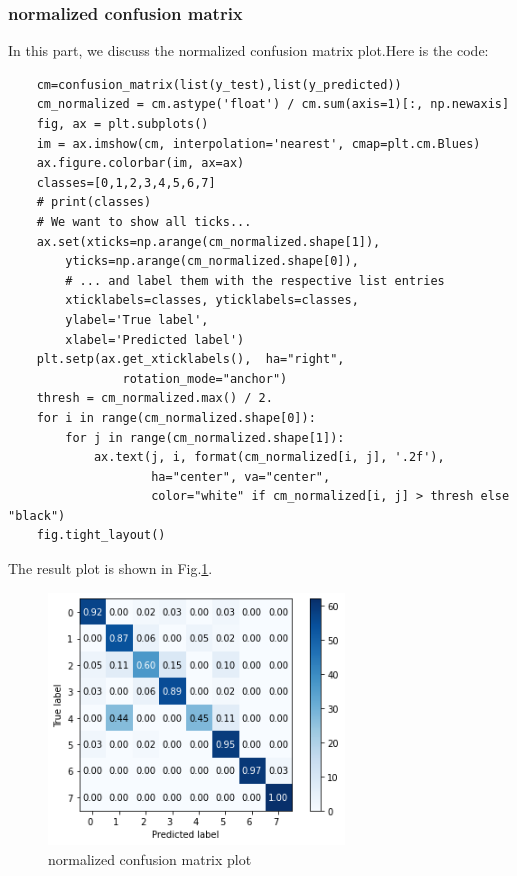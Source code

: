 \documentclass[conference]{IEEEtran}
\begin{document}
\subsubsection{normalized confusion matrix}
In this part, we discuss the normalized confusion matrix plot.Here is the code:
\begin{lstlisting}
    cm=confusion_matrix(list(y_test),list(y_predicted))
    cm_normalized = cm.astype('float') / cm.sum(axis=1)[:, np.newaxis]
    fig, ax = plt.subplots()
    im = ax.imshow(cm, interpolation='nearest', cmap=plt.cm.Blues)
    ax.figure.colorbar(im, ax=ax)
    classes=[0,1,2,3,4,5,6,7]
    # print(classes)
    # We want to show all ticks...
    ax.set(xticks=np.arange(cm_normalized.shape[1]),
        yticks=np.arange(cm_normalized.shape[0]),
        # ... and label them with the respective list entries
        xticklabels=classes, yticklabels=classes,
        ylabel='True label',
        xlabel='Predicted label')
    plt.setp(ax.get_xticklabels(),  ha="right",
                rotation_mode="anchor")
    thresh = cm_normalized.max() / 2.
    for i in range(cm_normalized.shape[0]):
        for j in range(cm_normalized.shape[1]):
            ax.text(j, i, format(cm_normalized[i, j], '.2f'),
                    ha="center", va="center",
                    color="white" if cm_normalized[i, j] > thresh else "black")
    fig.tight_layout()
\end{lstlisting}
The result plot is shown in Fig.\ref{Fig.t3q1c}.
\begin{figure}[H] 
    \centering %
    \includegraphics[width=0.7\textwidth]{T3Q1c.png} %
    \caption{normalized confusion matrix plot} %
    \label{Fig.t3q1c} %
\end{figure}
\end{document}
